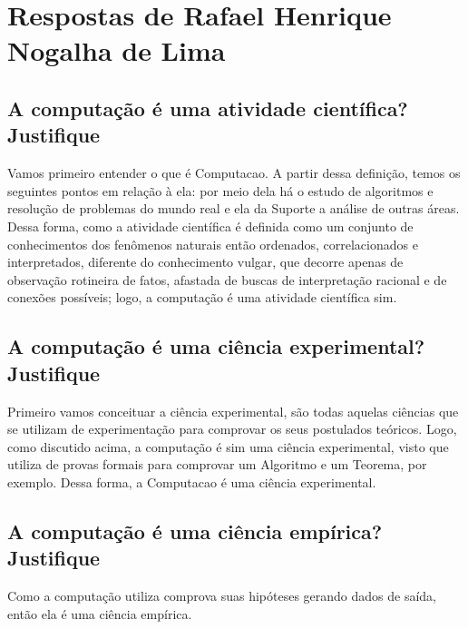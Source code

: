 \section{Respostas de Rafael Henrique Nogalha de Lima\label{tarefa-rafaelnogalha-componentes-eperimento}}


\subsection{A computação é uma atividade científica? Justifique}

Vamos primeiro entender o que é \gls{Computacao}. A partir dessa definição, temos os seguintes pontos em relação à ela: por meio dela há o estudo de algoritmos e resolução de problemas do mundo real e ela da \gls{Suporte} a análise de outras áreas. Dessa forma, como a atividade científica é definida como um conjunto de conhecimentos dos fenômenos naturais então ordenados, correlacionados e interpretados, diferente do conhecimento vulgar, que decorre apenas de observação rotineira de fatos, afastada de buscas de interpretação racional e de conexões possíveis; logo, a computação é uma atividade científica sim.

\subsection{A computação é uma ciência experimental? Justifique}

Primeiro vamos conceituar a ciência experimental, são todas aquelas ciências que se utilizam de experimentação para comprovar os seus postulados teóricos. Logo, como discutido acima, a computação é sim uma ciência experimental, visto que utiliza de provas formais para comprovar um \gls{Algoritmo} e um Teorema, por exemplo. Dessa forma, a \gls{Computacao} é uma ciência experimental.

\subsection{A computação é uma ciência empírica? Justifique}

Como a computação utiliza comprova suas hipóteses gerando dados de saída, então ela é uma ciência empírica.